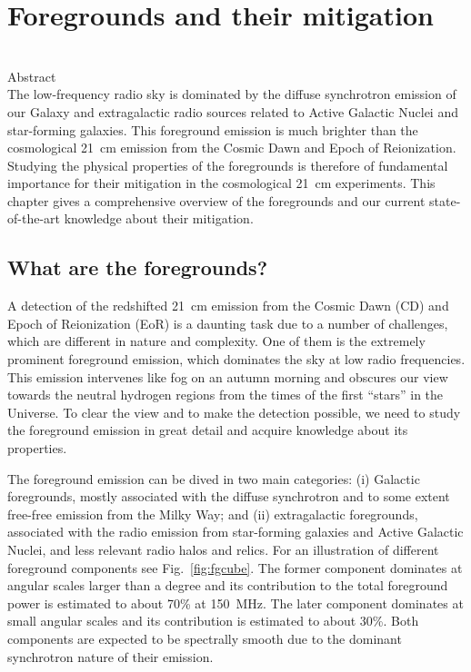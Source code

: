 \chapter{Foregrounds and their mitigation}
\begin{bf}
	\author{Emma Chapman (Imperial College London) \\and Vibor Jeli\'c (Ru{\dj}er Bo\v{s}kovi\'c Institute)}\\

\noindent Abstract\\
The low-frequency radio sky is dominated by the diffuse synchrotron emission of our Galaxy and extragalactic radio sources related to Active Galactic Nuclei and star-forming galaxies. This foreground emission  is much brighter than the cosmological 21~cm emission from the Cosmic Dawn and Epoch of Reionization. Studying the physical properties of the foregrounds is therefore of fundamental importance for their mitigation in the cosmological 21~cm experiments. This chapter gives a comprehensive overview of the foregrounds and our current state-of-the-art knowledge about their mitigation.
\end{bf}

\section{What are the foregrounds?}
A detection of the redshifted 21~cm emission from the Cosmic Dawn (CD) and Epoch of Reionization (EoR) is a daunting task due to a number of challenges, which are different in nature and complexity. One of them is the extremely prominent foreground emission, which dominates the sky at low radio frequencies.  This emission intervenes like fog on an autumn morning and obscures our view towards the neutral hydrogen regions from the times of the first ``stars'' in the Universe. To clear the view and to make the detection possible, we need to study the foreground emission in great detail and acquire knowledge about its properties.

The foreground emission can be dived in two main categories: (i) Galactic foregrounds, mostly associated with the diffuse synchrotron and to some extent free-free emission from the Milky Way; and (ii) extragalactic foregrounds, associated with the radio emission from star-forming galaxies and Active Galactic Nuclei, and less relevant radio halos and relics. For an illustration of different foreground components see Fig.~\ref{fig:fgcube}. The former component dominates at angular scales larger than a degree and its contribution to the total foreground power is estimated to about 70\% at 150~MHz. The later component dominates at small angular scales and its contribution is estimated to about 30\%.  Both components are expected to be spectrally smooth due to the dominant synchrotron nature of their emission. 

